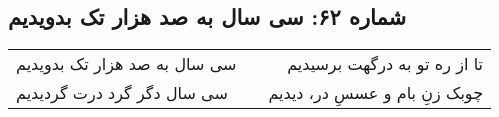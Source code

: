\begin{center}
\section*{شماره ۶۲: سی سال به صد هزار تک بدویدیم}
\label{sec:062}
\begin{longtable}{l p{0.5cm} r}
سی سال به صد هزار تک بدویدیم
&&
تا از ره تو به درگهت برسیدیم
\\
سی سال دگر گرد درت گردیدیم
&&
چوبک زنِ بام و عسسِ در، دیدیم
\\
\end{longtable}
\end{center}
